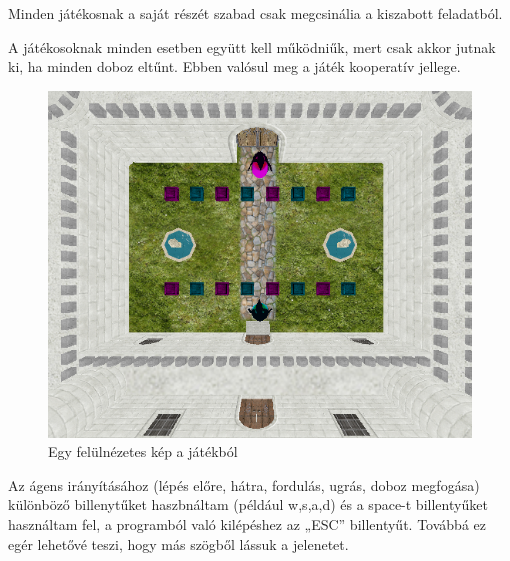 Minden játékosnak a saját részét szabad csak megcsinália a kiszabott feladatból. 

A játékosoknak minden esetben együtt kell működniűk, mert csak akkor jutnak ki, ha minden doboz eltűnt. Ebben valósul meg a játék kooperatív jellege. 

\begin{figure}[htp]
    \centering
   	\includegraphics[scale=0.7]{images/game.png}
	\caption{Egy felülnézetes kép a játékból}
	\label{fig:game}
\end{figure}



Az ágens irányításához (lépés előre, hátra, fordulás, ugrás, doboz megfogása) különböző billenytűket haszbnáltam (például w,s,a,d) és a space-t billentyűket használtam fel, a  programból való kilépéshez az „ESC” billentyűt. Továbbá ez egér lehetővé teszi, hogy más szögből lássuk a jelenetet.

